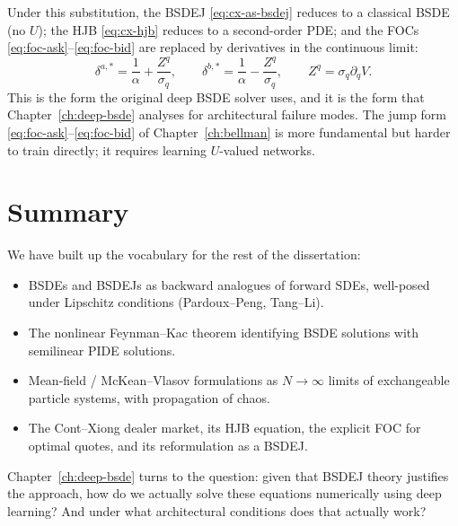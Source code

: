 Under this substitution, the BSDEJ \eqref{eq:cx-as-bsdej} reduces to a classical BSDE (no $U$); the HJB \eqref{eq:cx-hjb} reduces to a second-order PDE; and the FOCs \eqref{eq:foc-ask}--\eqref{eq:foc-bid} are replaced by derivatives in the continuous limit:
\begin{equation}
  \delta^{a,*} = \frac{1}{\alpha} + \frac{Z^q}{\sigma_q}, \qquad \delta^{b,*} = \frac{1}{\alpha} - \frac{Z^q}{\sigma_q}, \qquad Z^q = \sigma_q \partial_q V.
  \label{eq:cx-foc-diffusion}
\end{equation}
This is the form the original deep BSDE solver \cite{garry2026preprint2} uses, and it is the form that Chapter~\ref{ch:deep-bsde} analyses for architectural failure modes. The jump form \eqref{eq:foc-ask}--\eqref{eq:foc-bid} of Chapter~\ref{ch:bellman} is more fundamental but harder to train directly; it requires learning $U$-valued networks.

\section{Summary}

We have built up the vocabulary for the rest of the dissertation:
\begin{itemize}[leftmargin=2em]
  \item BSDEs and BSDEJs as backward analogues of forward SDEs, well-posed under Lipschitz conditions (Pardoux--Peng, Tang--Li).
  \item The nonlinear Feynman--Kac theorem identifying BSDE solutions with semilinear PIDE solutions.
  \item Mean-field / McKean--Vlasov formulations as $N \to \infty$ limits of exchangeable particle systems, with propagation of chaos.
  \item The Cont--Xiong dealer market, its HJB equation, the explicit FOC for optimal quotes, and its reformulation as a BSDEJ.
\end{itemize}

Chapter~\ref{ch:deep-bsde} turns to the question: given that BSDEJ theory justifies the approach, how do we actually solve these equations numerically using deep learning? And under what architectural conditions does that actually work?
